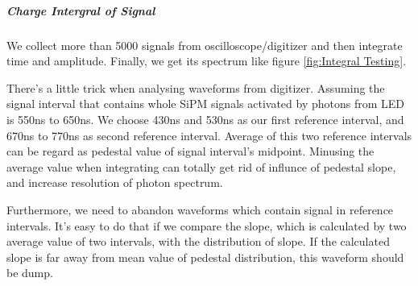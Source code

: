\documentclass[11pt,a4paper]{article}
\begin{document}
    \subparagraph{Charge Intergral of Signal}

    We collect more than 5000 signals from oscilloscope/digitizer and then integrate time and amplitude. Finally, we get its
    spectrum like figure \ref{fig:Integral Testing}.

    There's a little trick when analysing waveforms from digitizer. Assuming the signal interval that contains whole SiPM signals activated
    by photons from LED is 550ns to 650ns.
    We choose 430ns and 530ns as our first reference interval, and 670ns to 770ns as second reference interval. 
    Average of this two reference intervals can be regard as pedestal value of signal interval's midpoint.
    Minusing the average value when integrating can totally get rid of influnce of pedestal slope, and increase resolution of photon spectrum.

    Furthermore, we need to abandon waveforms which contain signal in reference intervals. It's easy to do that if we compare the slope, which is 
    calculated by two average value of two intervals, with the distribution of slope. If the calculated slope is far away from mean value of 
    pedestal distribution, this waveform should be dump.
\end{document}
